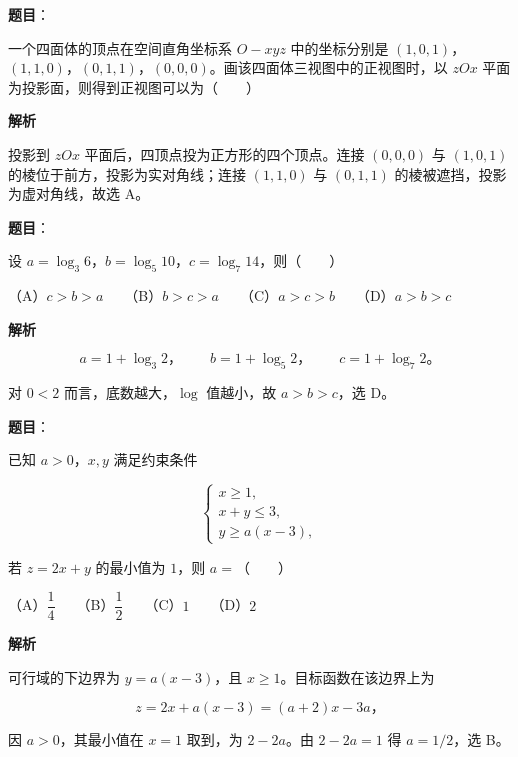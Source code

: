 \begin{answer}

\textbf{题目}：

一个四面体的顶点在空间直角坐标系 $O-xyz$ 中的坐标分别是 $(1,0,1)$，$(1,1,0)$，$(0,1,1)$，$(0,0,0)$。画该四面体三视图中的正视图时，以 $zOx$ 平面为投影面，则得到正视图可以为\mbox{（　　）}
\nopagebreak[4]
\begin{center}\end{center}
\nopagebreak[4]
\textbf{解析}

投影到 $zOx$ 平面后，四顶点投为正方形的四个顶点。连接 $(0,0,0)$ 与 $(1,0,1)$ 的棱位于前方，投影为实对角线；连接 $(1,1,0)$ 与 $(0,1,1)$ 的棱被遮挡，投影为虚对角线，故选 A。


\end{answer}
\begin{answer}

\textbf{题目}：

设 $a=\log_3 6$，$b=\log_5 10$，$c=\log_7 14$，则\mbox{（　　）}

（A）$c>b>a$　　（B）$b>c>a$　　（C）$a>c>b$　　（D）$a>b>c$

\textbf{解析}

\nopagebreak[4]
\[a=1+\log_3 2\text{，}\qquad b=1+\log_5 2\text{，}\qquad c=1+\log_7 2\text{。}\]

对 $0<2$ 而言，底数越大，$\log$ 值越小，故 $a>b>c$，选 D。


\end{answer}
\begin{answer}

\textbf{题目}：

已知 $a>0$，$x,y$ 满足约束条件

\nopagebreak[4]
\[
\begin{cases}
x\geqslant1,\\
x+y\leqslant3,\\
y\geqslant a(x-3),
\end{cases}
\]

若 $z=2x+y$ 的最小值为 $1$，则 $a=$\mbox{（　　）}

（A）$\dfrac14$　　（B）$\dfrac12$　　（C）$1$　　（D）$2$

\textbf{解析}

可行域的下边界为 $y=a(x-3)$，且 $x\geqslant1$。目标函数在该边界上为

\nopagebreak[4]
\[z=2x+a(x-3)=(a+2)x-3a\text{，}\]

因 $a>0$，其最小值在 $x=1$ 取到，为 $2-2a$。由 $2-2a=1$ 得 $a=1/2$，选 B。


\end{answer}
